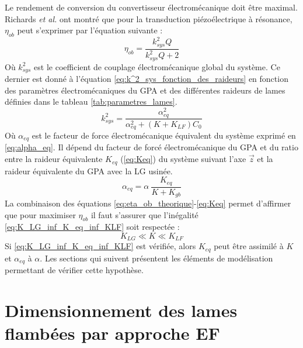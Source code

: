 Le rendement de conversion du convertisseur électromécanique doit être maximal. Richards \emph{et al.} ont montré que pour la transduction piézoélectrique à résonance, $\eta_{ob}$ peut s'exprimer par l'équation suivante \cite{Richards2004}: 
\begin{equation}
	\eta_{ob} = \dfrac{k^2_{sys}Q}{k^2_{sys}Q+2}
	\label{eq:eta_ob_theorique}
\end{equation}
Où $k^2_{sys}$ est le coefficient de couplage électromécanique global du système. Ce dernier est donné à l'équation \ref{eq:k^2_sys_fonction_des_raideurs} en fonction des paramètres électromécaniques du GPA et des différentes raideurs de lames définies dans le tableau \ref{tab:parametres_lames}.
\begin{equation}
	k^2_{sys} = \dfrac{\alpha^2_{eq}}{\alpha^2_{eq} + (K+K_{LF})C_0}
	\label{eq:k^2_sys_fonction_des_raideurs}
\end{equation}
Où $\alpha_{eq}$ est le facteur de force électromécanique équivalent du système exprimé en \ref{eq:alpha_eq}. Il dépend du facteur de forcé électromécanique du GPA et du ratio entre la raideur équivalente $K_{eq}$ (\ref{eq:Keq}) du système suivant l'axe $\vec{z}$ et la raideur équivalente du GPA avec la LG usinée.
\begin{equation}
	\alpha_{eq} = \alpha\ \dfrac{K_{eq}}{K + K_{gb}} 
	\label{eq:alpha_eq}
\end{equation}
La combinaison des équations \ref{eq:eta_ob_theorique}-\ref{eq:Keq} permet d'affirmer que pour maximiser $\eta_{ob}$ il faut s'assurer que l'inégalité \ref{eq:K_LG_inf_K_eq_inf_KLF} soit respectée : 
\begin{equation}
	K_{LG} \ll K \ll K_{LF}
	\label{eq:K_LG_inf_K_eq_inf_KLF}
\end{equation}
Si \ref{eq:K_LG_inf_K_eq_inf_KLF} est vérifiée, alors $K_{eq}$ peut être assimilé à $K$ et $\alpha_{eq}$ à $\alpha$. Les sections qui suivent présentent les éléments de modélisation permettant de vérifier cette hypothèse.

	\section{Dimensionnement des lames flambées par approche EF}
	\label{sec:3.4:Dimensionnement des lames flambees par approche en EF}
